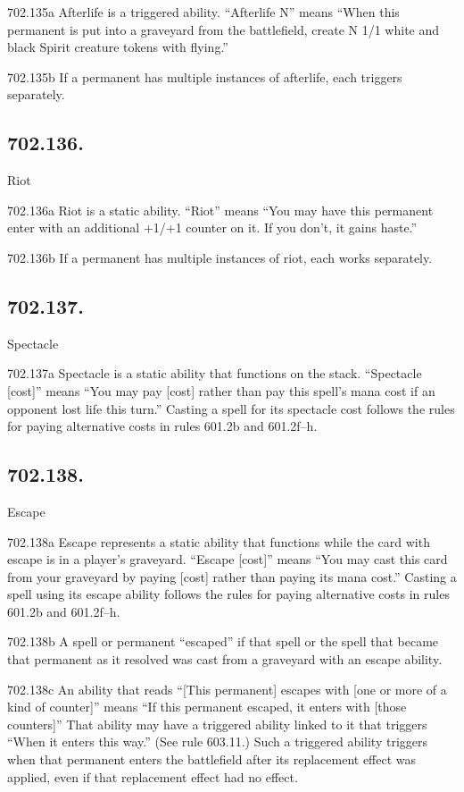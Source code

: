 702.135a Afterlife is a triggered ability. “Afterlife N” means “When this permanent is put into a graveyard from the battlefield, create N 1/1 white and black Spirit creature tokens with flying.”

702.135b If a permanent has multiple instances of afterlife, each triggers separately.

\subsection*{702.136.}
Riot

702.136a Riot is a static ability. “Riot” means “You may have this permanent enter with an additional +1/+1 counter on it. If you don’t, it gains haste.”

702.136b If a permanent has multiple instances of riot, each works separately.

\subsection*{702.137.}
Spectacle

702.137a Spectacle is a static ability that functions on the stack. “Spectacle [cost]” means “You may pay [cost] rather than pay this spell’s mana cost if an opponent lost life this turn.” Casting a spell for its spectacle cost follows the rules for paying alternative costs in rules 601.2b and 601.2f–h.

\subsection*{702.138.}
Escape

702.138a Escape represents a static ability that functions while the card with escape is in a player’s graveyard. “Escape [cost]” means “You may cast this card from your graveyard by paying [cost] rather than paying its mana cost.” Casting a spell using its escape ability follows the rules for paying alternative costs in rules 601.2b and 601.2f–h.

702.138b A spell or permanent “escaped” if that spell or the spell that became that permanent as it resolved was cast from a graveyard with an escape ability.

702.138c An ability that reads “[This permanent] escapes with [one or more of a kind of counter]” means “If this permanent escaped, it enters with [those counters]” That ability may have a triggered ability linked to it that triggers “When it enters this way.” (See rule 603.11.) Such a triggered ability triggers when that permanent enters the battlefield after its replacement effect was applied, even if that replacement effect had no effect.

